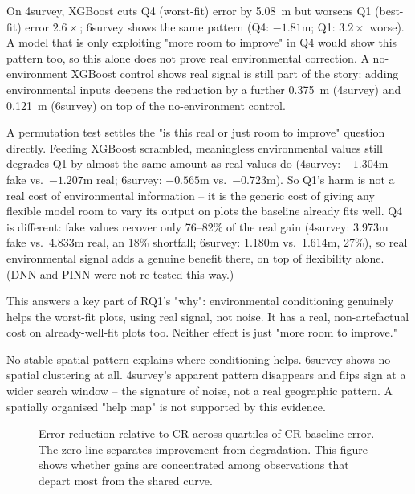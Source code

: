 On 4survey, XGBoost cuts Q4 (worst-fit) error by 5.08~m but worsens Q1 (best-fit) error
$2.6\times$; 6survey shows the same pattern (Q4: $-1.81$m; Q1: $3.2\times$ worse). A model that is
only exploiting "more room to improve" in Q4 would show this pattern too, so this alone does not
prove real environmental correction. A no-environment XGBoost control shows real signal is still
part of the story: adding environmental inputs deepens the reduction by a further 0.375~m
(4survey) and 0.121~m (6survey) on top of the no-environment control.

A permutation test settles the "is this real or just room to improve" question directly. Feeding
XGBoost scrambled, meaningless environmental values still degrades Q1 by almost the same amount as
real values do (4survey: $-1.304$m fake vs.\ $-1.207$m real; 6survey: $-0.565$m vs.\ $-0.723$m).
So Q1's harm is not a real cost of environmental information -- it is the generic cost of giving
any flexible model room to vary its output on plots the baseline already fits well. Q4 is
different: fake values recover only 76--82\% of the real gain (4survey: 3.973m fake vs.\ 4.833m
real, an 18\% shortfall; 6survey: 1.180m vs.\ 1.614m, 27\%), so real environmental signal adds a
genuine benefit there, on top of flexibility alone. (DNN and PINN were not re-tested this way.)

This answers a key part of RQ1's "why": environmental conditioning genuinely helps the worst-fit
plots, using real signal, not noise. It has a real, non-artefactual cost on already-well-fit
plots too. Neither effect is just "more room to improve."

No stable spatial pattern explains where conditioning helps. 6survey shows no spatial clustering
at all. 4survey's apparent pattern disappears and flips sign at a wider search window -- the
signature of noise, not a real geographic pattern. A spatially organised "help map" is not
supported by this evidence.


\begin{figure}[!htbp]
\centering
{}
\caption{Error reduction relative to CR across quartiles of CR baseline error. The zero line
separates improvement from degradation. This figure shows whether gains are concentrated among
observations that depart most from the shared curve.}
\label{fig:cr-error-quartiles}
\end{figure}


